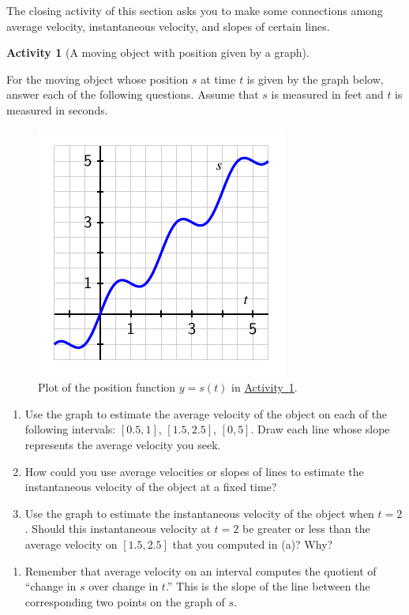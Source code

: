 \documentclass[10pt,]{book}
\theoremstyle{plain}
\theoremstyle{definition}
\theoremstyle{definition}
\theoremstyle{definition}
\theoremstyle{definition}
\newtheorem{activity}[project]{Activity}
\theoremstyle{definition}
\numberwithin{equation}{section}
\begin{document}
\par

  The closing activity of this section asks you to make some connections among average velocity, instantaneous velocity, and slopes of certain lines.
\begin{activity}[A moving object with position given by a graph]\label{act-1-2-3}

          For the moving object whose position \(s\) at time \(t\) is given by the graph below, answer each of the following questions. Assume that \(s\) is measured in feet and \(t\) is measured in seconds.
\leavevmode%
\begin{figure}
\centering
\includegraphics[width=0.5\linewidth]{images/1_2_Act3}
\caption{Plot of the position function \(y = s(t)\) in \hyperref[act-1-2-3]{Activity~\ref{act-1-2-3}}.\label{figure-7}}
\end{figure}
\leavevmode%
\begin{enumerate}[label=\alph*lpha]
\item\hypertarget{li-72}{}Use the graph to estimate the average velocity of the object on each of the following intervals: \([0.5,1]\), \([1.5,2.5]\), \([0,5]\).  Draw each line whose slope represents the average velocity you seek.%
\item\hypertarget{li-73}{}How could you use average velocities or slopes of lines to estimate the instantaneous velocity of the object at a fixed time?%
\item\hypertarget{li-74}{}Use the graph to estimate the instantaneous velocity of the object when \(t = 2\).  Should this instantaneous velocity at \(t = 2\) be greater or less than the average velocity on \([1.5,2.5]\) that you computed in (a)?  Why?%
\end{enumerate}
\leavevmode%
\begin{enumerate}[label=\alph*lpha]
\item\hypertarget{li-75}{}Remember that average velocity on an interval computes the quotient of ``change in \(s\) over change in \(t\).''  This is the slope of the line between the corresponding two points on the graph of \(s\).%

\end{enumerate}
\end{activity}
\end{document}
